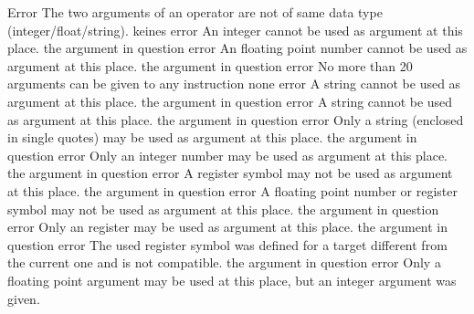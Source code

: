 \documentclass[12pt,twoside]{report}
\begin{document}
\begin{description}
               {Error}
               {The two arguments of an operator are not of same
                data type (integer/\-float/\-string).}
               {keines}
               {error}
               {An integer cannot be used as argument at this place.}
               {the argument in question}
               {error}
               {An floating point number cannot be used as argument at this place.}
               {the argument in question}
               {error}
               {No more than 20 arguments can be given to any instruction}
               {none}
               {error}
               {A string cannot be used as argument at this place.}
               {the argument in question}
               {error}
               {A string cannot be used as argument at this place.}
               {the argument in question}
               {error}
               {Only a string (enclosed in single quotes) may be used as
                argument at this place.}
               {the argument in question}
               {error}
               {Only an integer number may be used as argument at this place.}
               {the argument in question}
               {error}
               {A register symbol may not be used as argument at this place.}
               {the argument in question}
               {error}
               {A floating point number or register symbol may not be used as argument at this place.}
               {the argument in question}
               {error}
               {Only an register may be used as argument at this place.}
               {the argument in question}
               {error}
               {The used register symbol was defined for a target different from
                the current one and is not compatible.}
               {the argument in question}
               {error}
               {Only a floating point argument may be used at this place,
                but an integer argument was given.}

\end{description}
\end{document}
